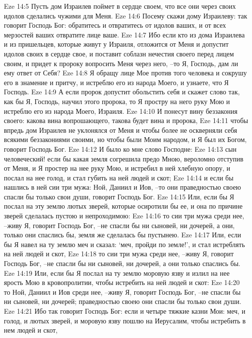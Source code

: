 Eze 14:5  Пусть дом Израилев поймет в сердце своем, что все они через своих идолов сделались чужими для Меня.
Eze 14:6  Посему скажи дому Израилеву: так говорит Господь Бог: обратитесь и отвратитесь от идолов ваших, и от всех мерзостей ваших отвратите лице ваше.
Eze 14:7  Ибо если кто из дома Израилева и из пришельцев, которые живут у Израиля, отложится от Меня и допустит идолов своих в сердце свое, и поставит соблазн нечестия своего перед лицем своим, и придет к пророку вопросить Меня через него, --то Я, Господь, дам ли ему ответ от Себя?
Eze 14:8  Я обращу лице Мое против того человека и сокрушу его в знамение и притчу, и истреблю его из народа Моего, и узнаете, что Я Господь.
Eze 14:9  А если пророк допустит обольстить себя и скажет слово так, как бы Я, Господь, научил этого пророка, то Я простру на него руку Мою и истреблю его из народа Моего, Израиля.
Eze 14:10  И понесут вину беззакония своего: какова вина вопрошающего, такова будет вина и пророка,
Eze 14:11  чтобы впредь дом Израилев не уклонялся от Меня и чтобы более не оскверняли себя всякими беззакониями своими, но чтобы были Моим народом, и Я был их Богом, говорит Господь Бог.
Eze 14:12  И было ко мне слово Господне:
Eze 14:13  сын человеческий! если бы какая земля согрешила предо Мною, вероломно отступив от Меня, и Я простер на нее руку Мою, и истребил в ней хлебную опору, и послал на нее голод, и стал губить на ней людей и скот;
Eze 14:14  и если бы нашлись в ней сии три мужа: Ной, Даниил и Иов, --то они праведностью своею спасли бы только свои души, говорит Господь Бог.
Eze 14:15  Или, если бы Я послал на эту землю лютых зверей, которые осиротили бы ее, и она по причине зверей сделалась пустою и непроходимою:
Eze 14:16  то сии три мужа среди нее, --живу Я, говорит Господь Бог, --не спасли бы ни сыновей, ни дочерей, а они, только они спаслись бы, земля же сделалась бы пустынею.
Eze 14:17  Или, если бы Я навел на ту землю меч и сказал: `меч, пройди по земле!', и стал истреблять на ней людей и скот,
Eze 14:18  то сии три мужа среди нее, --живу Я, говорит Господь Бог, --не спасли бы ни сыновей, ни дочерей, а они только спаслись бы.
Eze 14:19  Или, если бы Я послал на ту землю моровую язву и излил на нее ярость Мою в кровопролитии, чтобы истребить на ней людей и скот:
Eze 14:20  то Ной, Даниил и Иов среди нее, --живу Я, говорит Господь Бог, --не спасли бы ни сыновей, ни дочерей; праведностью своею они спасли бы только свои души.
Eze 14:21  Ибо так говорит Господь Бог: если и четыре тяжкие казни Мои: меч, и голод, и лютых зверей, и моровую язву пошлю на Иерусалим, чтобы истребить в нем людей и скот,
